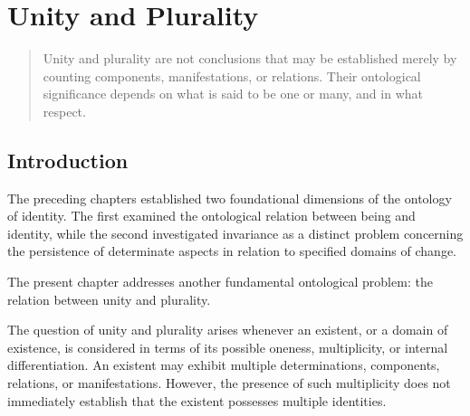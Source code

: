 

\chapter{Unity and Plurality}
\label{ch:unity-and-plurality}


\newcommand{\ChapterThreeTitle}{Unity and Plurality}
\newcommand{\ChapterThreeID}{VS.B01.P01.C03}


\begin{quote}
Unity and plurality are not conclusions that may be
established merely by counting components, manifestations,
or relations. Their ontological significance depends on
what is said to be one or many, and in what respect.
\end{quote}


\section*{Introduction}

The preceding chapters established two foundational
dimensions of the ontology of identity. The first examined
the ontological relation between being and identity,
while the second investigated invariance as a distinct
problem concerning the persistence of determinate aspects
in relation to specified domains of change.

The present chapter addresses another fundamental
ontological problem: the relation between unity and
plurality.

The question of unity and plurality arises whenever an
existent, or a domain of existence, is considered in
terms of its possible oneness, multiplicity, or internal
differentiation. An existent may exhibit multiple
determinations, components, relations, or manifestations.
However, the presence of such multiplicity does not
immediately establish that the existent possesses multiple
identities.

